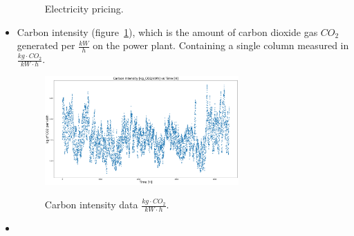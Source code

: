 \documentclass{article}
\numberwithin{equation}{subsection}
\begin{document}
\begin{itemize}
		\begin{figure}[H]
		\centering	
			 \quad
		\caption{\small Electricity pricing.}
		\end{figure}
	\item Carbon intensity (figure~\ref{fig:carbon}), which is the amount of carbon dioxide gas $CO_2$ generated per $\frac{kW}{h}$ on the power plant. Containing a single column measured in $\frac{kg\cdot CO_2}{kW\cdot h}$. 
		\begin{figure}[H]
		{\centering
		  {\includegraphics[width = 0.7\textwidth]{carbonIntensity.png}
		  }
		  \par}
		\caption{Carbon intensity data $\frac{kg\cdot CO_2}{kW\cdot h}$.}
		\label{fig:carbon}
		\end{figure}
	\item 


\end{itemize}
\end{document}
